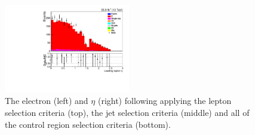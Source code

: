 \begin{figure}[ht]
\includegraphics[width=0.49\textwidth]{figs/background-estimation/plots/unblinded/ttbar_control/lep1Eta_SingleTop_wMass_emu.pdf}
\caption{
The electron \pT (left) and $\eta$ (right) following applying the lepton selection criteria (top), the jet selection criteria (middle) and all of the \ttbar control region selection criteria (bottom).
}
\label{fig:App_ttbar_electron}
\end{figure}

